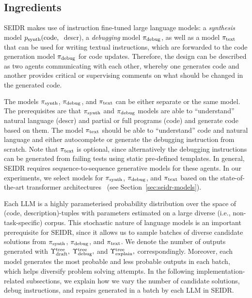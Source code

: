 \subsection{Ingredients}
\label{sec:seidr-ingredients}

SEIDR makes use of instruction fine-tuned large language models: a \emph{synthesis} model $p_{\text{synth}}(\text{code, }$ descr), a \emph{debugging} model $ \pi_\text{debug} $, as well as a model $ \pi_\text{text} $ that can be used for writing textual instructions, which are forwarded to the code generation model $ \pi_\text{debug} $ for code updates. 
Therefore, the design can be described as two agents communicating with each other, whereby one generates code and another provides critical or supervising comments on what should be changed in the generated code. 

The models $ \pi_\text{synth} $, $ \pi_\text{debug} $, and $ \pi_\text{text} $ can be either separate or the same model.
The prerequisites are that $ \pi_\text{synth} $ and $ \pi_\text{debug} $ models are able to ``understand'' natural language (descr) and partial or full programs (code) and generate code based on them. 
The model $ \pi_\text{text} $ should be able to ``understand'' code and natural language and either autocomplete or generate the debugging instruction from scratch. 
Note that $ \pi_\text{text} $ is optional, since alternatively the debugging instructions can be generated from failing tests using static pre-defined templates.
In general, SEIDR requires sequence-to-sequence generative models for these agents. 
In our experiments, we select models for $ \pi_\text{synth} $, $ \pi_\text{debug} $, and $ \pi_\text{text} $ based on the state-of-the-art transformer architectures~\cite{vaswaniAttentionAllYou2023} 
(see Section~\ref{sec:seidr-models}). 

Each LLM is a highly parameterised probability distribution over the space of (code, description)-tuples with parameters estimated on a large diverse (i.e., non-task-specific) corpus.
This stochastic nature of language models is an important prerequisite for SEIDR, since it allows us to sample batches of diverse candidate solutions from $ \pi_\text{synth} $, $ \pi_\text{debug} $, and $ \pi_\text{text} $. 
We denote the number of outputs generated with $\Upsilon^\text{tree}_\text{draft},$ $\Upsilon^\text{tree}_\text{debug},$ and $\Upsilon^\text{tree}_\text{explain},$ correspondingly.
Moreover, each model generates the most probable and less probable outputs in each batch, which helps diversify problem solving attempts. 
In the following implementation-related subsections, we explain how we vary the number of candidate solutions, debug instructions, and repairs generated in a batch by each LLM in SEIDR.

